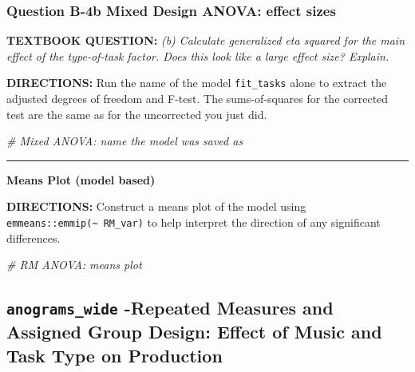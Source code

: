 \documentclass[
]{article}
\newenvironment{Shaded}{\begin{snugshade}}{\end{snugshade}}
\newcommand{\CommentTok}[1]{\textcolor[rgb]{0.56,0.35,0.01}{\textit{#1}}}
\begin{document}
\clearpage

\hypertarget{question-b-4b-mixed-design-anova-effect-sizes}{%
\subsubsection{Question B-4b Mixed Design ANOVA: effect
sizes}\label{question-b-4b-mixed-design-anova-effect-sizes}}

\textbf{TEXTBOOK QUESTION:} \emph{(b) Calculate generalized eta squared
for the main effect of the type-of-task factor. Does this look like a
large effect size? Explain.}

\textbf{DIRECTIONS:} Run the name of the model \texttt{fit\_tasks} alone
to extract the adjusted degrees of freedom and F-test. The
sums-of-squares for the corrected test are the same as for the
uncorrected you just did.

\begin{Shaded}
\begin{Highlighting}[]
\CommentTok{\# Mixed ANOVA: name the model was saved as}
\end{Highlighting}
\end{Shaded}

\begin{center}\rule{0.5\linewidth}{0.5pt}\end{center}

\textbf{Means Plot (model based)}

\textbf{DIRECTIONS:} Construct a means plot of the model using
\texttt{emmeans::emmip(\textasciitilde{}\ RM\_var)} to help interpret
the direction of any significant differences.

\begin{Shaded}
\begin{Highlighting}[]
\CommentTok{\# RM ANOVA: means plot}
\end{Highlighting}
\end{Shaded}

\clearpage

\hypertarget{anograms_wide--repeated-measures-and-assigned-group-design-effect-of-music-and-task-type-on-production}{%
\subsection{\texorpdfstring{\texttt{anograms\_wide} -Repeated Measures
and Assigned Group Design: Effect of Music and Task Type on
Production}{anograms\_wide -Repeated Measures and Assigned Group Design: Effect of Music and Task Type on Production}}\label{anograms_wide--repeated-measures-and-assigned-group-design-effect-of-music-and-task-type-on-production}}
\end{document}
